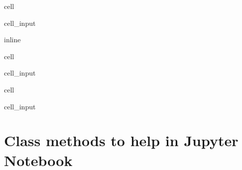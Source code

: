 \documentclass[letterpaper,10pt,english]{jupyterBook}
\begin{document}
\begin{sphinxuseclass}{cell}\begin{sphinxVerbatimInput}

\begin{sphinxuseclass}{cell_input}
\begin{sphinxVerbatim}[commandchars=\\\{\}]
 inline
\end{sphinxVerbatim}

\end{sphinxuseclass}\end{sphinxVerbatimInput}

\end{sphinxuseclass}
\begin{sphinxuseclass}{cell}\begin{sphinxVerbatimInput}

\begin{sphinxuseclass}{cell_input}
\begin{sphinxVerbatim}[commandchars=\\\{\}]
    
\end{sphinxVerbatim}

\end{sphinxuseclass}\end{sphinxVerbatimInput}

\end{sphinxuseclass}
\begin{sphinxuseclass}{cell}\begin{sphinxVerbatimInput}

\begin{sphinxuseclass}{cell_input}
\begin{sphinxVerbatim}[commandchars=\\\{\}]
    
\end{sphinxVerbatim}

\end{sphinxuseclass}\end{sphinxVerbatimInput}

\end{sphinxuseclass}

\section{Class methods to help in Jupyter Notebook}
\label{\detokenize{content/notebooks/modelflow_features:class-methods-to-help-in-jupyter-notebook}}
\end{document}
